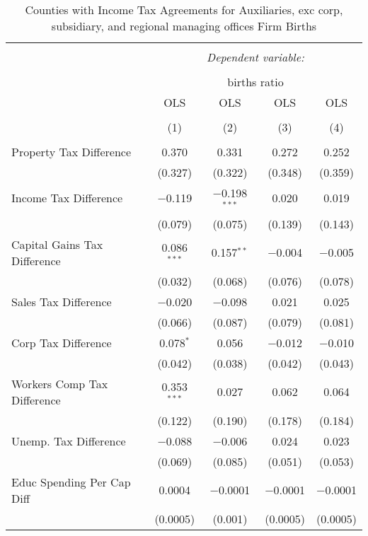 
\begin{table}[!htbp] \centering 
  \caption{Counties with Income Tax Agreements for  Auxiliaries, exc corp, subsidiary, and regional managing offices Firm Births} 
  \label{95rd} 
\begin{tabular}{@{\extracolsep{5pt}}lcccc} 
\\[-1.8ex]\hline 
\hline \\[-1.8ex] 
 & \multicolumn{4}{c}{\textit{Dependent variable:}} \\ 
\cline{2-5} 
\\[-1.8ex] & \multicolumn{4}{c}{births ratio} \\ 
 & OLS & OLS & OLS & OLS \\ 
\\[-1.8ex] & (1) & (2) & (3) & (4)\\ 
\hline \\[-1.8ex] 
 Property Tax Difference & 0.370 & 0.331 & 0.272 & 0.252 \\ 
  & (0.327) & (0.322) & (0.348) & (0.359) \\ 
  Income Tax Difference & $-$0.119 & $-$0.198$^{***}$ & 0.020 & 0.019 \\ 
  & (0.079) & (0.075) & (0.139) & (0.143) \\ 
  Capital Gains Tax Difference & 0.086$^{***}$ & 0.157$^{**}$ & $-$0.004 & $-$0.005 \\ 
  & (0.032) & (0.068) & (0.076) & (0.078) \\ 
  Sales Tax Difference & $-$0.020 & $-$0.098 & 0.021 & 0.025 \\ 
  & (0.066) & (0.087) & (0.079) & (0.081) \\ 
  Corp Tax Difference & 0.078$^{*}$ & 0.056 & $-$0.012 & $-$0.010 \\ 
  & (0.042) & (0.038) & (0.042) & (0.043) \\ 
  Workers Comp Tax Difference & 0.353$^{***}$ & 0.027 & 0.062 & 0.064 \\ 
  & (0.122) & (0.190) & (0.178) & (0.184) \\ 
  Unemp. Tax Difference & $-$0.088 & $-$0.006 & 0.024 & 0.023 \\ 
  & (0.069) & (0.085) & (0.051) & (0.053) \\ 
  Educ Spending Per Cap Diff & 0.0004 & $-$0.0001 & $-$0.0001 & $-$0.0001 \\ 
  & (0.0005) & (0.001) & (0.0005) & (0.0005) \\ 

\end{tabular}
\end{table}
